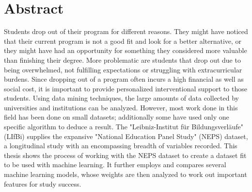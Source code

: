 
\section*{Abstract}
Students drop out of their program for different reasons. They might have noticed that their current program is not a good fit and look for a better alternative, or they might have had an opportunity for something they considered more valuable than finishing their degree. More problematic are students that drop out due to being overwhelmed, not fulfilling expectations or struggling with extracurricular burdens. Since dropping out of a program often incurs a high financial as well as social cost, it is important to provide personalized interventional support to those students. Using data mining techniques, the large amounts of data collected by universities and institutions can be analyzed. However, most work done in this field has been done on small datasets; additionally some have used only one specific algorithm to deduce a result. The "Leibniz-Institut für Bildungsverläufe" (LIfBi) supplies the expansive "National Education Panel Study" (NEPS) dataset, a longitudinal study with an encompassing breadth of variables recorded. This thesis shows the process of working with the NEPS dataset to create a dataset fit to be used with machine learning. It further employs and compares several machine learning models, whose weights are then analyzed to work out important features for study success.
